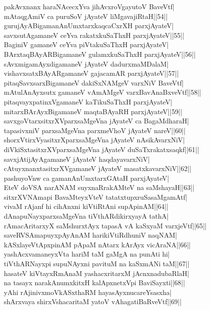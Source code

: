 \documentclass{article}
\begin{document}
pakAvxnanx haraNAcecxYva jihAvxroVgayutoV BaveVtf|\\
mAtaqgAmiV ca puruSoV jAyateV liMgavajiRtaH||54||\\
gurujAyABigamanAnUmxtarxkaqcaCxrXH parxjAyateV|\\
savxsutAgamaneV ceYva rakatxkuSaThxH parxjAyateV||55||\\
BaginiV gamaneV ceYva piVtakuSaThxH parxjAyateV|\\
BArxtaqBAyARBigamaneV gulamxkuSaThxH parxjAyateV||56||\\
sAvxmigamAyxdigamaneV jAyateV dadurxmaMDalaM|\\
vishavxsatxBAyARgamaneV gajacamAR parxjAyateV||57||\\
pitaqSavxsarxBigamaneV dakiSxNAMgeV varxNiV BaveVtf|\\
mAtulAnAyxsutx gamaneV vAmAMgeV varxBavAnaBxveVtf||58||\\
pitaqvayxpatinxVgamaneV kaTikuSaThxH parxjAyateV|\\
mitarxBArAyxBigamaneV maqtaBAyaRH parxjAyateV||59||\\
savxgoVtarxsitxrXVparxsaMgeVna jAyateV ca BagaMdharaH|\\
tapasivxniV parxsaMgeVna parxmeVhoV jAyateV nareV||60||\\
shorxVtirxVyasitxrXparxsaMgeVna jAyateV nAsikAvarxNiV|\\
diVkiSxtasitxrXVparxsaMgeVna jAyateV duSaTxrakatxsaqkf||61||\\
savxjAtijAyAgamaneV jAyateV haqdayavarxNiV|\\
cAtuyxnanxtasitxrXVgamaneV jAyateV  masatxkavarxNiV||62||\\
pashuyoVnw ca gamanAnUmxtarxGAtaH parxjAyateV|\\
EteV doVSA narANAM suyxnaRrakAMteV na saMshayaH||63||\\
sitxrXVNAmapi BavaMteyxVteV tatatxtupxruSasaMgamAtf|\\
vivaM rAjanf hi cihAnxni kiVtiRtAni supApinAM||64||\\
dAnapuNayxparxsaMgeVna tiVthARdikirxyayA tathA|\\
rAmacAritarxyX saMshurxtAyx tapasA vA kaSxyaM varxjeVtf||65||\\
saveRVSAmapuyxpAyAnAM harikiVtiRdhuniV naqNAM|\\
kASxlayeVtApxpinAM pApaM nAtarx kArAyx vicAraNA||66||\\
yashAcxvamaneyxVta hariM taM gaMgA na punAti hi|\\
tiVthARNayxpi supuNAyxni pavituM na kaSxmANi taM||67||\\
hasateV kiVtayxRmAnaM yashacxritarxM jAcnxnadubaRlaH|\\
na tasayx narakAnumxkitxH kalApxnetxVpi BaviSayxti||68||\\
yAhi rAjinivxmoVkASxthaRM hayasAyxnucareYsasxha|\\
shArxvaya shirxVshacaritaM yatoV vAhagatiBaRveVtf||69||\\
\end{document}
